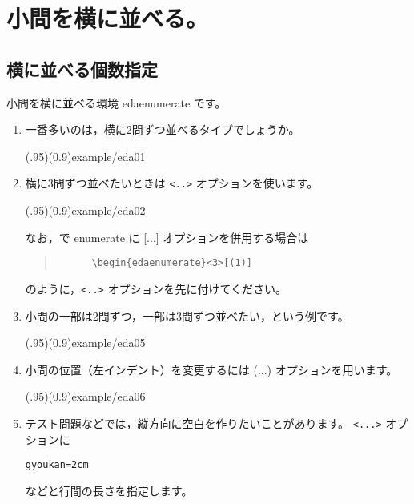 \documentclass[a4j]{jarticle}
\begin{document}
\clearpage

\section{小問を横に並べる。}
\subsection{横に並べる個数指定}
小問を横に並べる環境 \textsf{edaenumerate} です。

{
\renewcommand{\labelenumi}{\Alph{enumi}.}%
\renewcommand{\labelenumii}{【\arabic{enumii}】}%
\renewcommand{\labelenumiii}{(\arabic{enumiii})}%

\begin{enumerate}
\item 一番多いのは，横に2問ずつ並べるタイプでしょうか。

(.95)(0.9){example/eda01}
\clearpage

\item 横に3問ずつ並べたいときは \texttt{<..>} オプションを使います。

(.95)(0.9){example/eda02}

なお，\LaTeXe で \textsf{enumerate} に [...] オプションを併用する場合は
\begin{quote}\begin{verbatim}
      \begin{edaenumerate}<3>[(1)]
\end{verbatim}
\end{quote}
のように，\verb/<..>/ オプションを先に付けてください。

\pagebreak

\item 小問の一部は2問ずつ，一部は3問ずつ並べたい，という例です。

\showexample[\texttt{変則}](.95)(0.9){example/eda05}
\pagebreak

\item 小問の位置（左インデント）を変更するには (...) オプションを用います。

\showexample[edaenumerate(...)](.95)(0.9){example/eda06}


\pagebreak

\item テスト問題などでは，縦方向に空白を作りたいことがあります。
\verb+<...>+ オプションに
\begin{jquote}
\texttt{gyoukan=2cm}
\end{jquote}
などと行間の長さを指定します。


\end{enumerate}}
\end{document}
